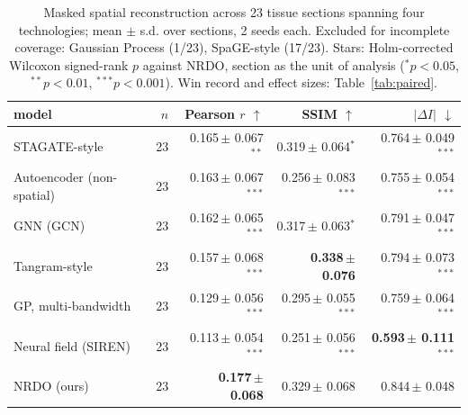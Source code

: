 \begin{table}[htbp]
\centering
\small
\caption{Masked spatial reconstruction across 23 tissue sections spanning four technologies; mean $\pm$ s.d. over sections, 2 seeds each. Excluded for incomplete coverage: Gaussian Process (1/23), SpaGE-style (17/23). Stars: Holm-corrected Wilcoxon signed-rank $p$ against NRDO, section as the unit of analysis ($^{*}p<0.05$, $^{**}p<0.01$, $^{***}p<0.001$). Win record and effect sizes: Table~\ref{tab:paired}.}
\label{tab:multisection}
\begin{tabular}{lrrrr}
\toprule
model & $n$ & Pearson $r$ $\uparrow$ & SSIM $\uparrow$ & $|\Delta I|$ $\downarrow$\\
\midrule
STAGATE-style & 23 & 0.165\,\tiny{$\pm$ 0.067}$^{**}$ & 0.319\,\tiny{$\pm$ 0.064}$^{*}$ & 0.764\,\tiny{$\pm$ 0.049}$^{***}$ \\
Autoencoder (non-spatial) & 23 & 0.163\,\tiny{$\pm$ 0.067}$^{***}$ & 0.256\,\tiny{$\pm$ 0.083}$^{***}$ & 0.755\,\tiny{$\pm$ 0.054}$^{***}$ \\
GNN (GCN) & 23 & 0.162\,\tiny{$\pm$ 0.065}$^{***}$ & 0.317\,\tiny{$\pm$ 0.063}$^{*}$ & 0.791\,\tiny{$\pm$ 0.047}$^{***}$ \\
Tangram-style & 23 & 0.157\,\tiny{$\pm$ 0.068}$^{***}$ & \textbf{0.338\,\tiny{$\pm$ 0.076}} & 0.794\,\tiny{$\pm$ 0.073}$^{***}$ \\
GP, multi-bandwidth & 23 & 0.129\,\tiny{$\pm$ 0.056}$^{***}$ & 0.295\,\tiny{$\pm$ 0.055}$^{***}$ & 0.759\,\tiny{$\pm$ 0.064}$^{***}$ \\
Neural field (SIREN) & 23 & 0.113\,\tiny{$\pm$ 0.054}$^{***}$ & 0.251\,\tiny{$\pm$ 0.056}$^{***}$ & \textbf{0.593\,\tiny{$\pm$ 0.111}}$^{***}$ \\
\midrule
NRDO (ours) & 23 & \textbf{0.177\,\tiny{$\pm$ 0.068}} & 0.329\,\tiny{$\pm$ 0.068} & 0.844\,\tiny{$\pm$ 0.048} \\
\bottomrule
\end{tabular}
\end{table}
